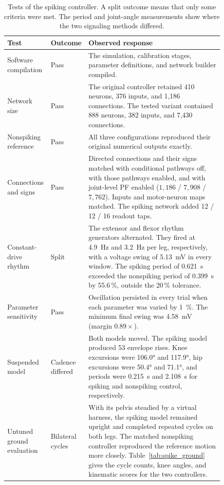 \begin{table}
\caption{Tests of the spiking controller. A split outcome means that only some criteria were met. The period and joint-angle measurements show where the two signaling methods differed.}
\label{tab:app_spk_gates}
\begin{tabular}{@{}>{\raggedright\arraybackslash}p{0.16\linewidth}>{\raggedright\arraybackslash}p{0.10\linewidth}p{0.62\linewidth}@{}}
\toprule
\textbf{Test} & \textbf{Outcome} & \textbf{Observed response} \\
\midrule
Software compilation & Pass & The simulation, calibration stages, parameter definitions, and network builder compiled. \\
Network size & Pass & The original controller retained 410 neurons, 376 inputs, and 1,186 connections. The tested variant contained 888 neurons, 382 inputs, and 7,430 connections. \\
Nonspiking reference & Pass & All three configurations reproduced their original numerical outputs exactly. \\
Connections and signs & Pass & Directed connections and their signs matched with conditional pathways off, with those pathways enabled, and with joint-level PF enabled ($1{,}186$ / $7{,}908$ / $7{,}762$). Inputs and motor-neuron maps matched. The spiking network added 12 / 12 / 16 readout taps. \\
Constant-drive rhythm & Split & The extensor and flexor rhythm generators alternated. They fired at \qty{4.9}{\hertz} and \qty{3.2}{\hertz} per leg, respectively, with a voltage swing of \qty{5.13}{\mV} in every window. The spiking period of \qty{0.621}{\second} exceeded the nonspiking period of \qty{0.399}{\second} by 55.6\,\%, outside the 20\,\% tolerance. \\
Parameter sensitivity & Pass & Oscillation persisted in every trial when each parameter was varied by \qty{1}{\percent}. The minimum final swing was \qty{4.58}{\mV} (margin $0.89\times$). \\
Suspended model & Cadence differed & Both models moved. The spiking model produced 53 envelope rises. Knee excursions were \ang{106.0} and \ang{117.9}, hip excursions were \ang{50.4} and \ang{71.1}, and periods were \qty{0.215}{\second} and \qty{2.108}{\second} for spiking and nonspiking control, respectively. \\
Untuned ground evaluation & Bilateral cycles & With its pelvis steadied by a virtual harness, the spiking model remained upright and completed repeated cycles on both legs. The matched nonspiking controller reproduced the reference motion more closely. Table~\ref{tab:spike_ground} gives the cycle counts, knee angles, and kinematic scores for the two controllers. \\

\end{tabular}
\end{table}

